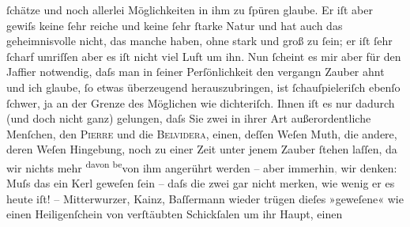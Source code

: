 \begin{ledgroupsized}[t]{13cm}
               ſchätze und noch allerlei Möglichkeiten in ihm zu ſpüren glaube. Er iſt aber gewiſs
               keine ſehr reiche und keine ſehr ſtarke Natur und hat auch das geheimnisvolle nicht,
               das manche haben, ohne stark {\pb}und groß zu ſein; er iſt
               ſehr ſcharf umriſſen aber es iſt nicht viel Luft um ihn. Nun ſcheint es mir aber für
               den Jaffier notwendig, daſs man
               in ſeiner Perſönlichkeit den vergangn Zauber ahnt und ich glaube, ſo etwas überzeugend herauszubringen, ist ſchauſpieleriſch ebenſo ſchwer, ja an der Grenze
               des Möglichen wie dichteriſch. Ihnen iſt es nur dadurch (und doch nicht ganz)
               gelungen, daſs Sie zwei in ihrer Art außerordentliche Menſchen, den \textsc{Pierre} und die \textsc{Belvidera}, {\pb}einen, deſſen Weſen Muth, die andere, deren
               Weſen Hingebung, noch zu einer Zeit unter jenem Zauber ſtehen laſſen, da wir nichts
               mehr \substVorne{}\textsuperscript{davon be}{\allowbreak}\substDazwischen{}von ihm\substHinten{} angerührt werden – aber immerhin\textcolor{gray}{,} wir denken: Muſs das
               ein Kerl geweſen ſein – daſs die zwei gar nicht merken, wie wenig er es heute iſt! –
                  Mitterwurzer, Kainz, Baſſermann wieder trügen dieſes
               »geweſene« wie einen Heiligenſchein von verſtäubten Schickſalen um ihr Haupt, einen

\end{ledgroupsized}
